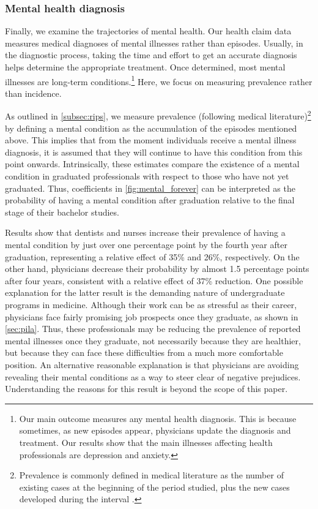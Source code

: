 \documentclass[12pt, a4paper]{article}
\begin{document}
\subsubsection{Mental health diagnosis}
Finally, we examine the trajectories of mental health. Our health claim data measures medical diagnoses of mental illnesses rather than episodes. Usually, in the diagnostic process, taking the time and effort to get an accurate diagnosis helps determine the appropriate treatment. Once determined, most mental illnesses are long-term conditions.\footnote{Our main outcome measures any mental health diagnosis. This is because sometimes, as new episodes appear, physicians update the diagnosis and treatment. Our results show that the main illnesses affecting health professionals are depression and anxiety.} Here, we focus on measuring prevalence rather than incidence. 


As outlined in \autoref{subsec:rips}, we measure prevalence (following medical literature)\footnote{Prevalence is commonly defined in medical literature as the number of existing cases at the beginning of the period studied, plus the new cases developed during the interval \citet{gbd2022global}.} by defining a mental condition as the accumulation of the episodes mentioned above. This implies that from the moment individuals receive a mental illness diagnosis, it is assumed that they will continue to have this condition from this point onwards. Intrinsically, these estimates compare the existence of a mental condition in graduated professionals with respect to those who have not yet graduated. Thus, coefficients in \autoref{fig:mental_forever} can be interpreted as the probability of having a mental condition after graduation relative to the final stage of their bachelor studies.

Results show that dentists and nurses increase their prevalence of having a mental condition by just over one percentage point by the fourth year after graduation, representing a relative effect of 35\% and 26\%, respectively. On the other hand, physicians decrease their probability by almost 1.5 percentage points after four years, consistent with a relative effect of 37\% reduction. One possible explanation for the latter result is the demanding nature of undergraduate programs in medicine. Although their work can be as stressful as their career, physicians face fairly promising job prospects once they graduate, as shown in \autoref{sec:pila}. Thus, these professionals may be reducing the prevalence of reported mental illnesses once they graduate, not necessarily because they are healthier, but because they can face these difficulties from a much more comfortable position. An alternative reasonable explanation is that physicians are avoiding revealing their mental conditions as a way to steer clear of negative prejudices. Understanding the reasons for this result is beyond the scope of this paper. 
\end{document}
